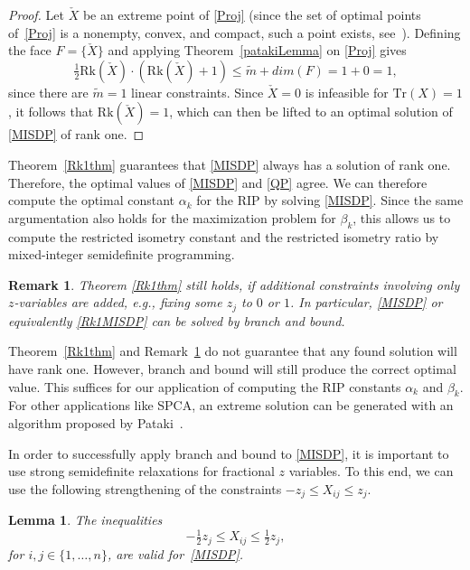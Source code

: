 \documentclass[journal]{IEEEtran}
\newtheorem{remark}{Remark}
\newtheorem{lemma}[theorem]{Lemma}
\newcommand{\Tr}{\text{Tr}}
\newcommand{\Rk}{\text{Rk}}
\begin{document}
\begin{proof}
  Let $\check{X}$ be an extreme point of \eqref{Proj} (since the set of
  optimal points of~\eqref{Proj} is a nonempty, convex, and compact, such a
  point exists, see~\cite[Corollary 18.5.1]{Roc70}). Defining the face $F =
  \{\check{X}\}$ and applying Theorem~\ref{patakiLemma} on \eqref{Proj}
  gives
  \begin{equation*}
    \tfrac{1}{2} \Rk(\check{X}) \cdot (\Rk(\check{X})+1) \leq \tilde{m} + dim(F) = 1 + 0 = 1,
  \end{equation*}
  since there are $\tilde{m} = 1$ linear constraints. Since $\check{X} = 0$
  is infeasible for $\Tr(X) = 1$, it follows that $\Rk(\check{X}) = 1$,
  which can then be lifted to an optimal solution of \eqref{MISDP} of rank
  one.
\end{proof}

Theorem~\ref{Rk1thm} guarantees that \eqref{MISDP} always has a solution of
rank one. Therefore, the optimal values of \eqref{MISDP} and \eqref{QP}
agree. We can therefore compute the optimal constant $\alpha_k$ for the RIP
by solving \eqref{MISDP}. Since the same argumentation also holds for the
maximization problem for $\beta_k$, this allows us to compute the
restricted isometry constant and the restricted isometry ratio by
mixed-integer semidefinite programming.

\begin{remark}\label{Rk1rmk}
  Theorem \ref{Rk1thm} still holds, if additional constraints involving
  only $z$-variables are added, e.g., fixing some $z_j$ to $0$ or $1$. In
  particular, \eqref{MISDP} or equivalently \eqref{Rk1MISDP} can be
  solved by branch and bound.
\end{remark}

Theorem~\ref{Rk1thm} and Remark~\ref{Rk1rmk} do not guarantee that any
found solution will have rank one. However, branch and bound will still
produce the correct optimal value. This suffices for our application of
computing the RIP constants $\alpha_k$ and $\beta_k$. For other
applications like SPCA, an extreme solution can be generated with an
algorithm proposed by Pataki~\cite{coneLP}.

In order to successfully apply branch and bound to \eqref{MISDP}, it is
important to use strong semidefinite relaxations for fractional $z$
variables. To this end, we can use the following strengthening of the
constraints $-z_j \leq X_{ij} \leq z_j$.

\begin{lemma}\label{HalfConstraint} 
  The inequalities
  \begin{equation}\label{eq:HalfConstraint}
    -\tfrac{1}{2} z_j \leq X_{ij} \leq \tfrac{1}{2} z_j,
  \end{equation}
  for $i, j \in \{1, \dots, n\}$, are valid for~\eqref{MISDP}.
\end{lemma}
\end{document}
